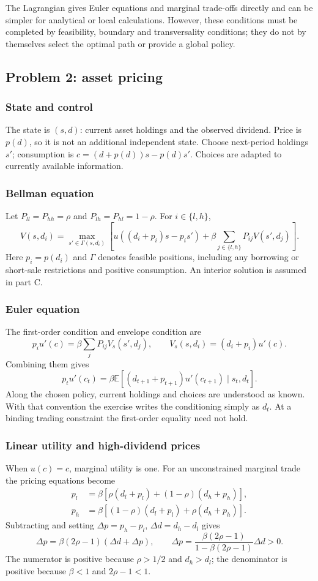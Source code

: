 The Lagrangian gives Euler equations and marginal trade-offs directly and can be simpler for analytical or local calculations. However, these conditions must be completed by feasibility, boundary and transversality conditions; they do not by themselves select the optimal path or provide a global policy.

\subsection*{Problem 2: asset pricing}
\setcounter{subsubsection}{0}
\subsubsection{State and control}
The state is $(s,d)$: current asset holdings and the observed dividend. Price is $p(d)$, so it is not an additional independent state. Choose next-period holdings $s'$; consumption is $c=(d+p(d))s-p(d)s'$. Choices are adapted to currently available information.

\subsubsection{Bellman equation}
Let $P_{ll}=P_{hh}=\rho$ and $P_{lh}=P_{hl}=1-\rho$. For $i\in\lbrace l,h\rbrace $,
\[
V(s,d_i)=\max_{s'\in\Gamma(s,d_i)}\left[u((d_i+p_i)s-p_i s')+\beta\sum_{j\in\lbrace l,h\rbrace }P_{ij}V(s',d_j)\right].
\]
Here $p_i=p(d_i)$ and $\Gamma$ denotes feasible positions, including any borrowing or short-sale restrictions and positive consumption. An interior solution is assumed in part C.

\subsubsection{Euler equation}
The first-order condition and envelope condition are
\[
p_i u'(c)=\beta\sum_jP_{ij}V_s(s',d_j),\qquad
V_s(s,d_i)=(d_i+p_i)u'(c).
\]
Combining them gives
\[
p_tu'(c_t)=\beta\mathbb{E}\left[(d_{t+1}+p_{t+1})u'(c_{t+1})\mid s_t,d_t\right].
\]
Along the chosen policy, current holdings and choices are understood as known. With that convention the exercise writes the conditioning simply as $d_t$. At a binding trading constraint the first-order equality need not hold.

\subsubsection{Linear utility and high-dividend prices}
When $u(c)=c$, marginal utility is one. For an unconstrained marginal trade the pricing equations become
\[
\begin{aligned}
p_l&=\beta[\rho(d_l+p_l)+(1-\rho)(d_h+p_h)],\\
p_h&=\beta[(1-\rho)(d_l+p_l)+\rho(d_h+p_h)].
\end{aligned}
\]
Subtracting and setting $\Delta p=p_h-p_l$, $\Delta d=d_h-d_l$ gives
\[
\Delta p=\beta(2\rho-1)(\Delta d+\Delta p),\qquad
\Delta p=\frac{\beta(2\rho-1)}{1-\beta(2\rho-1)}\Delta d>0.
\]
The numerator is positive because $\rho>1/2$ and $d_h>d_l$; the denominator is positive because $\beta<1$ and $2\rho-1<1$.

